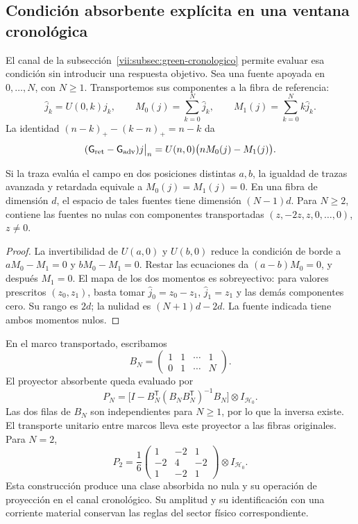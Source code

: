 \subsection{Condición absorbente explícita en una ventana cronológica}
\label{vii:subsec:absorcion-momentos}

El canal de la subsección~\ref{vii:subsec:green-cronologico} permite
evaluar esa condición sin introducir una respuesta objetivo. Sea una
fuente apoyada en \(0,\ldots,N\), con \(N\geq1\). Transportemos
sus componentes a la fibra de referencia:
\[
 \widehat j_k=U(0,k)j_k,\qquad
 M_0(j)=\sum_{k=0}^N\widehat j_k,\qquad
 M_1(j)=\sum_{k=0}^Nk\widehat j_k.
\]
La identidad \((n-k)_+-(k-n)_+=n-k\) da
\begin{equation}
 (\mathsf{G}_{\rm ret}-\mathsf{G}_{\rm adv})j\big|_n
 =U(n,0)\bigl(nM_0(j)-M_1(j)\bigr).
 \label{vii:eq:diferencia-green-momentos}
\end{equation}

\begin{proposition}
\label{vii:prop:absorcion-momentos}
Si la traza evalúa el campo en dos posiciones distintas \(a,b\),
la igualdad de trazas avanzada y retardada equivale a
\(M_0(j)=M_1(j)=0\). En una fibra de dimensión \(d\), el espacio
de tales fuentes tiene dimensión \((N-1)d\). Para \(N\geq2\),
contiene las fuentes no nulas con componentes transportadas
\((z,-2z,z,0,\ldots,0)\), \(z\neq0\).
\end{proposition}
\begin{proof}
La invertibilidad de \(U(a,0)\) y \(U(b,0)\) reduce la condición
de borde a \(aM_0-M_1=0\) y \(bM_0-M_1=0\).
Restar las ecuaciones da \((a-b)M_0=0\), y después \(M_1=0\).
El mapa de los dos momentos es sobreyectivo: para valores prescritos
\((z_0,z_1)\), basta tomar
\(\widehat j_0=z_0-z_1\), \(\widehat j_1=z_1\) y las demás
componentes cero. Su rango es \(2d\); la nulidad es
\((N+1)d-2d\). La fuente indicada tiene ambos momentos nulos.
\end{proof}

En el marco transportado, escribamos
\[
 B_N=\begin{pmatrix}1&1&\cdots&1\\0&1&\cdots&N\end{pmatrix}.
\]
El proyector absorbente queda evaluado por
\begin{equation}
 P_N=\bigl[I-B_N^{\mathsf T}(B_NB_N^{\mathsf T})^{-1}B_N\bigr]
       \otimes I_{\mathcal H_0}.
 \label{vii:eq:proyector-momentos-cronologicos}
\end{equation}
Las dos filas de \(B_N\) son independientes para \(N\geq1\), por lo
que la inversa existe. El transporte unitario entre marcos lleva este
proyector a las fibras originales. Para \(N=2\),
\[
 P_2=\frac16
 \begin{pmatrix}1&-2&1\\-2&4&-2\\1&-2&1\end{pmatrix}
 \otimes I_{\mathcal H_0}.
\]
Esta construcción produce una clase absorbida no nula y su operación de
proyección en el canal cronológico. Su amplitud y su identificación con una
corriente material conservan las reglas del sector físico correspondiente.

